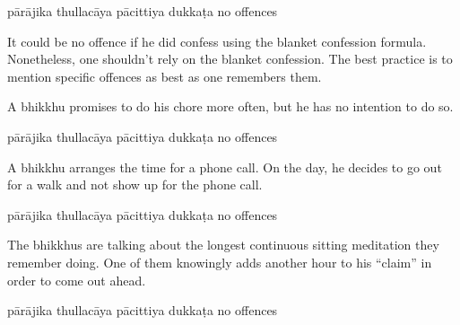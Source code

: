 \begin{exam}{\autoExamName}
\begin{problem*}
\begin{parts}
  \begin{answers}{5}
    \bChoices
     pārājika\eAns
     thullacāya\eAns
     pācittiya\eAns
     dukkaṭa\eAns
     no offences\eAns
    \eChoices
  \end{answers}

  \begin{solution}
    It could be no offence if he did confess using the blanket confession
    formula. Nonetheless, one shouldn't rely on the blanket confession. The best
    practice is to mention specific offences as best as one remembers them.
  \end{solution}

  \bigskip

\item A bhikkhu promises to do his chore more often, but he has no intention to
  do so.

  \bigskip

  \begin{answers}{5}
    \bChoices
     pārājika\eAns
     thullacāya\eAns
     pācittiya\eAns
     dukkaṭa\eAns
     no offences\eAns
    \eChoices
  \end{answers}

  \bigskip

\item A bhikkhu arranges the time for a phone call. On the day, he decides to go
  out for a walk and not show up for the phone call.

  \bigskip

  \begin{answers}{5}
    \bChoices
     pārājika\eAns
     thullacāya\eAns
     pācittiya\eAns
     dukkaṭa\eAns
     no offences\eAns
    \eChoices
  \end{answers}

  \bigskip

\item The bhikkhus are talking about the longest continuous sitting meditation
  they remember doing. One of them knowingly adds another hour to his ``claim''
  in order to come out ahead.

  \bigskip

  \begin{answers}{5}
    \bChoices
     pārājika\eAns
     thullacāya\eAns
     pācittiya\eAns
     dukkaṭa\eAns
     no offences\eAns
    \eChoices
  \end{answers}

  \bigskip


\end{parts}
\end{problem*}
\end{exam}
